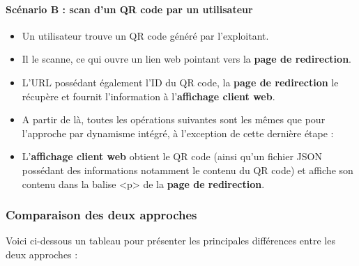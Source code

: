 \documentclass[a4paper,12pt]{article}
\begin{document}
\paragraph{Scénario B : scan d'un QR code par un utilisateur}
\begin{itemize}
 \item Un utilisateur trouve un QR code généré par l'exploitant.
 \item Il le scanne, ce qui ouvre un lien web pointant vers la \textbf{page de redirection}.
 \item L'URL possédant également l'ID du QR code, la \textbf{page de redirection} le récupère et fournit l'information à l'\textbf{affichage client web}. 
 \item A partir de là, toutes les opérations suivantes sont les mêmes que pour l'approche par dynamisme intégré, à l'exception de cette dernière étape :
 \item L'\textbf{affichage client web} obtient le QR code (ainsi qu'un fichier JSON possédant des informations notamment le contenu du QR code) et affiche son contenu dans la balise <p> de la \textbf{page de redirection}.
\end{itemize}

\subsubsection{Comparaison des deux approches}
\label{compApproches}

\noindent Voici ci-dessous un tableau pour présenter les principales différences entre les deux approches :\\
\end{document}
